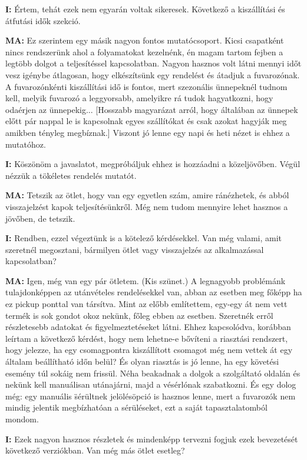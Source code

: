 \documentclass{imc-inf}
\begin{document}
\begin{appendices}
  \noindent\textbf{I:} Értem, tehát ezek nem egyarán voltak sikeresek. Következő a kiszállítási és átfutási idők szekció.

  \noindent\textbf{MA:} Ez szerintem egy másik nagyon fontos mutatócsoport. Kicsi csapatként nincs rendszerünk ahol a folyamatokat kezelnénk, én magam tartom fejben a legtöbb dolgot a teljesítéssel kapcsolatban. Nagyon hasznos volt látni mennyi időt vesz igénybe átlagosan, hogy elkészítsünk egy rendelést és átadjuk a fuvarozónak. A fuvarozónkénti kiszállítási idő is fontos, mert szezonális ünnepeknél tudnom kell, melyik fuvarozó a leggyorsabb, amelyikre rá tudok hagyatkozni, hogy odaérjen az ünnepekig... [Hosszabb magyarázat arról, hogy általában az ünnepek előtt pár nappal le is kapcsolnak egyes szállítókat és csak azokat hagyják meg amikben tényleg megbíznak.] Viszont jó lenne egy napi és heti nézet is ehhez a mutatóhoz.

  \noindent\textbf{I:} Köszönöm a javaslatot, megpróbáljuk ehhez is hozzáadni a közeljövőben. Végül nézzük a tökéletes rendelés mutatót.

  \noindent\textbf{MA:} Tetszik az ötlet, hogy van egy egyetlen szám, amire ránézhetek, és abból visszajelzést kapok teljesítésünkről. Még nem tudom mennyire lehet hasznos a jövőben, de tetszik.

  \noindent\textbf{I:} Rendben, ezzel végeztünk is a kötelező kérdésekkel. Van még valami, amit szeretnél megosztani, bármilyen ötlet vagy visszajelzés az alkalmazással kapcsolatban?

  \noindent\textbf{MA:} Igen, még van egy pár ötletem. (Kis szünet.) A legnagyobb problémánk tulajdonképpen az utánvételes rendelésekkel van, abban az esetben meg főképp ha ez pickup ponttal van társítva. Mint az előbb említettem, egy-egy át nem vett termék is sok gondot okoz nekünk, főleg ebben az esetben. Szeretnék erről részletesebb adatokat és figyelmeztetéseket látni. Ehhez kapcsolódva, korábban leírtam a következő kérdést, hogy nem lehetne-e bővíteni a riasztási rendszert, hogy jelezze, ha egy csomagpontra kiszállított csomagot még nem vettek át egy általam beállítható időn belül? És olyan riasztás is jó lenne, ha egy követési esemény túl sokáig nem frissül. Néha beakadnak a dolgok a szolgáltató oldalán és nekünk kell manuálisan utánajárni, majd a vésérlónak szabatkozni. És egy dolog még: egy manuális \"sérültnek jelölés\" opció is hasznos lenne, mert a fuvarozók nem mindig jelentik megbízhatóan a sérüléseket, ezt a saját tapasztalatomból mondom.

  \noindent\textbf{I:} Ezek nagyon hasznos részletek és mindenképp tervezni fogjuk ezek bevezetését következő verziókban. Van még más ötlet esetleg?


\end{appendices}
\end{document}
